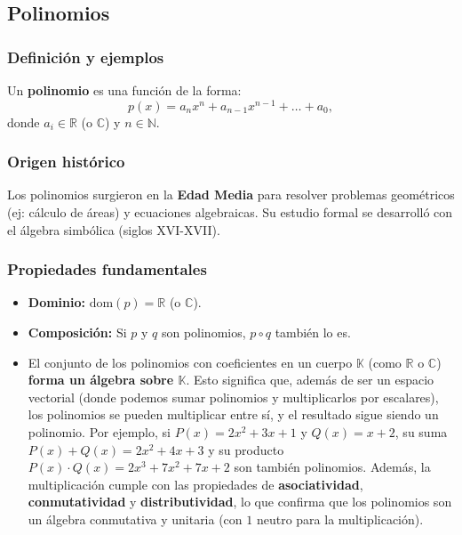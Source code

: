 \documentclass[12pt, a4paper]{article}
\theoremstyle{rioplatense}
\newcommand{\R}{\mathbb{R}}
\newcommand{\C}{\mathbb{C}}
\newcommand{\N}{\mathbb{N}}
\newcommand{\dom}{\text{dom}}
\begin{document}
\subsection{Polinomios}

\subsubsection{Definición y ejemplos}
Un \textbf{polinomio} es una función de la forma:
\[
p(x) = a_nx^n + a_{n-1}x^{n-1} + \dots + a_0,
\]
donde \( a_i \in \R \) (o \( \C \)) y \( n \in \N \).

\subsubsection{Origen histórico}
Los polinomios surgieron en la \textbf{Edad Media} para resolver problemas geométricos (ej: cálculo de áreas) y ecuaciones algebraicas. Su estudio formal se desarrolló con el álgebra simbólica (siglos XVI-XVII).

\subsubsection{Propiedades fundamentales}
\begin{itemize}
    \item \textbf{Dominio:} \( \dom(p) = \R \) (o \( \C \)).
    \item \textbf{Composición:} Si \( p \) y \( q \) son polinomios, \( p \circ q \) también lo es.
    \item El conjunto de los polinomios con coeficientes en un cuerpo $\mathbb{K}$ (como $\mathbb{R}$ o $\mathbb{C}$) \textbf{forma un álgebra sobre $\mathbb{K}$}. Esto significa que, además de ser un espacio vectorial (donde podemos sumar polinomios y multiplicarlos por escalares), los polinomios se pueden multiplicar entre sí, y el resultado sigue siendo un polinomio. Por ejemplo, si $P(x) = 2x^2 + 3x + 1$ y $Q(x) = x + 2$, su suma $P(x) + Q(x) = 2x^2 + 4x + 3$ y su producto $P(x) \cdot Q(x) = 2x^3 + 7x^2 + 7x + 2$ son también polinomios. Además, la multiplicación cumple con las propiedades de \textbf{asociatividad}, \textbf{conmutatividad} y \textbf{distributividad}, lo que confirma que los polinomios son un álgebra conmutativa y unitaria (con $1$ neutro para la multiplicación).

\end{itemize}
\end{document}
